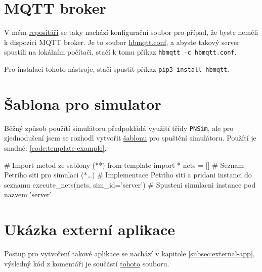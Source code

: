 \section{MQTT broker}

V mém \href{https://github.com/Danil-Grigorev/rt-sim-petry-net}{repositáři} se taky nachází konfigurační soubor pro případ, že byste neměli k dispozici MQTT broker. Je to soubor \href{https://github.com/Danil-Grigorev/rt-sim-petry-net/blob/master/hbmqtt.conf}{hbmqtt.conf}, a abyste takový server spustili na lokálním počítači, stačí k tomu příkaz \texttt{hbmqtt -c hbmqtt.conf}.

Pro instalaci tohoto nástroje, stačí spustit příkaz \texttt{pip3 install hbmqtt}.

\section{Šablona pro simulator}

Běžný způsob použítí simulátoru předpokládá využití třídy \texttt{PNSim}, ale pro zjednodušení jsem se rozhodl vytvořit \href{https://github.com/Danil-Grigorev/rt-sim-petry-net/blob/master/template.py}{šablonu} pro spuštění simulátoru. Použítí je snadné: \ref{code:template-example}.

\begin{python}
    # Import metod ze sablony (*\label{code:template-example}*)
    from template import *
    nets = [] # Seznam Petriho siti pro simulaci
    (*\ldots*) # Implementace Petriho siti a pridani instanci do seznamu
    execute_nets(nets, sim_id='server') # Spusteni simulacni instance pod nazvem 'server'
\end{python}

\section{Ukázka externí aplikace}
\label{sec:external-app-example}

Postup pro vytvoření takové aplikace se nachází v kapitole \ref{subsec:external-app}, výsledný kód z komentáři je součástí \href{https://github.com/Danil-Grigorev/rt-sim-petry-net/blob/master/temperature_logger.py}{tohoto} souboru.
